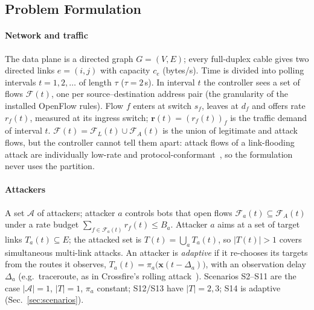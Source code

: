 \subsection{Problem Formulation}\label{sec:formulation}

\paragraph{Network and traffic}
The data plane is a directed graph $G=(V,E)$; every full-duplex cable gives two directed links
$e=(i,j)$ with capacity $c_e$ (bytes/s). Time is divided into polling intervals
$t=1,2,\dots$ of length $\tau$ ($\tau=2$\,s). In interval $t$ the controller sees a set of flows
$\mathcal{F}(t)$, one per source--destination address pair (the granularity of the installed
OpenFlow rules). Flow $f$ enters at switch $s_f$, leaves at $d_f$ and offers rate $r_f(t)$,
measured at its ingress switch; $\mathbf{r}(t)=(r_f(t))_f$ is the traffic demand of interval $t$.
$\mathcal{F}(t)=\mathcal{F}_L(t)\cup\mathcal{F}_A(t)$ is the union of legitimate and attack
flows, but the controller cannot tell them apart: attack flows of a link-flooding attack are
individually low-rate and protocol-conformant~\cite{kang2013crossfire}, so the formulation never
uses the partition.

\paragraph{Attackers}
A set $\mathcal{A}$ of attackers; attacker $a$ controls bots that open flows
$\mathcal{F}_a(t)\subseteq\mathcal{F}_A(t)$ under a rate budget $\sum_{f\in\mathcal{F}_a(t)}
r_f(t)\le B_a$. Attacker $a$ aims at a set of target links $T_a(t)\subseteq E$; the attacked
set is $T(t)=\bigcup_a T_a(t)$, so $|T(t)|>1$ covers simultaneous multi-link attacks. An attacker
is \emph{adaptive} if it re-chooses its targets from the routes it observes,
$T_a(t)=\pi_a\big(\mathbf{x}(t-\Delta_a)\big)$, with an observation delay $\Delta_a$
(e.g.\ traceroute, as in Crossfire's rolling attack~\cite{kang2013crossfire}). Scenarios
S2--S11 are the case $|\mathcal{A}|=1$, $|T|=1$, $\pi_a$ constant; S12/S13 have $|T|=2,3$; S14
is adaptive (Sec.~\ref{sec:scenarios}).

